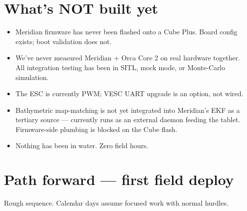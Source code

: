 \documentclass[10pt,a4paper]{article}
\begin{document}
\section{What's NOT built yet}
\begin{itemize}
\item Meridian firmware has never been flashed onto a Cube Plus. Board config exists; boot validation does not.
\item We've never measured Meridian + Orca Core 2 on real hardware together. All integration testing has been in SITL, mock mode, or Monte-Carlo simulation.
\item The ESC is currently PWM; VESC UART upgrade is an option, not wired.
\item Bathymetric map-matching is not yet integrated into Meridian's EKF as a tertiary source — currently runs as an external daemon feeding the tablet. Firmware-side plumbing is blocked on the Cube flash.
\item Nothing has been in water. Zero field hours.
\end{itemize}

\section{Path forward — first field deploy}
Rough sequence. Calendar days assume focused work with normal hurdles.
\end{document}
